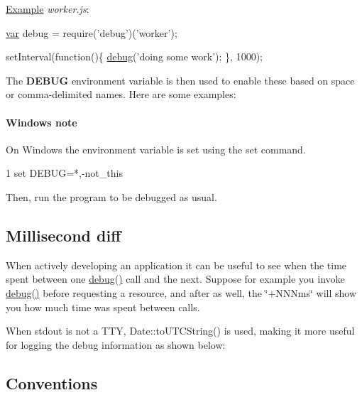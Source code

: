\hyperlink{struct_example}{Example} {\itshape worker.\+js}\+:


\begin{DoxyCode}
\hyperlink{018__def_8c_a335628f2e9085305224b4f9cc6e95ed5}{var} debug = require(\textcolor{stringliteral}{'debug'})(\textcolor{stringliteral}{'worker'});

setInterval(\textcolor{keyword}{function}()\{
  \hyperlink{addon_2doxmlparser_2src_2debug_8cpp_a0a777024bcc965d6200d9599eb187cd9}{debug}(\textcolor{stringliteral}{'doing some work'});
\}, 1000);
\end{DoxyCode}


The {\bfseries D\+E\+B\+U\+G} environment variable is then used to enable these based on space or comma-\/delimited names. Here are some examples\+:





\paragraph*{Windows note}

On Windows the environment variable is set using the {\ttfamily set} command.


\begin{DoxyCode}
1 set DEBUG=*,-not\_this
\end{DoxyCode}


Then, run the program to be debugged as usual.

\subsection*{Millisecond diff}

When actively developing an application it can be useful to see when the time spent between one {\ttfamily \hyperlink{addon_2doxmlparser_2src_2debug_8cpp_a0a777024bcc965d6200d9599eb187cd9}{debug()}} call and the next. Suppose for example you invoke {\ttfamily \hyperlink{addon_2doxmlparser_2src_2debug_8cpp_a0a777024bcc965d6200d9599eb187cd9}{debug()}} before requesting a resource, and after as well, the \char`\"{}+\+N\+N\+Nms\char`\"{} will show you how much time was spent between calls.



When stdout is not a T\+T\+Y, {\ttfamily Date\+::to\+U\+T\+C\+String()} is used, making it more useful for logging the debug information as shown below\+:



\subsection*{Conventions}

